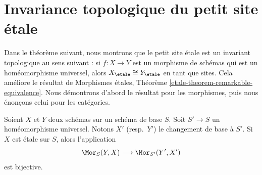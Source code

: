 \section{Invariance topologique du petit site \'etale}
\label{section-topological-invariance}

\noindent
Dans le th\'eor\`eme suivant, nous montrons que le petit site \'etale est un invariant
topologique au sens suivant : si $f : X \to Y$ est un morphisme de sch\'emas
qui est un hom\'eomorphisme universel, alors $X_\etale \cong Y_\etale$
en tant que sites. Cela am\'eliore le r\'esultat de
Morphismes étales, Th\'eor\`eme \ref{etale-theorem-remarkable-equivalence}.
Nous d\'emontrons d'abord le r\'esultat pour les morphismes, puis nous \'enon\c{c}ons celui
pour les cat\'egories.

\begin{theorem}
\label{theorem-etale-topological}
Soient $X$ et $Y$ deux sch\'emas sur un sch\'ema de base $S$. Soit
$S' \to S$ un hom\'eomorphisme universel.
Notons $X'$ (resp.\ $Y'$) le changement de base \`a $S'$.
Si $X$ est \'etale sur $S$, alors l'application
$$
\Mor_S(Y, X) \longrightarrow \Mor_{S'}(Y', X')
$$
est bijective.
\end{theorem}

